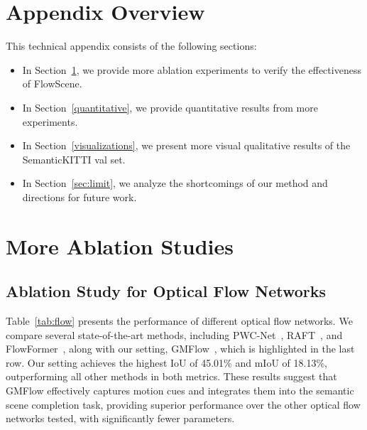 
\appendix

\section*{Appendix Overview}
This technical appendix consists of the following sections:
\begin{itemize}
\item
In Section~\ref{ablation}, we provide more ablation experiments to verify the effectiveness of FlowScene.
\item
In Section~\ref{quantitative}, we provide quantitative results from more experiments.
\item
In Section~\ref{visualizations}, we present more visual qualitative results of the SemanticKITTI val set.
\item
In Section~\ref{sec:limit},  we analyze the shortcomings of our method and directions for future work.
\end{itemize} 

\section{More Ablation Studies}
\label{ablation}
\subsection{Ablation Study for Optical Flow Networks}
Table~\ref{tab:flow} presents the performance of different optical flow networks. We compare several state-of-the-art methods, including PWC-Net~\cite{sun2018pwc}, RAFT~\cite{teed2020raft}, and FlowFormer~\cite{huang2022flowformer}, along with our setting, GMFlow~\cite{xu2022gmflow}, which is highlighted in the last row.
Our setting achieves the highest IoU of 45.01\% and mIoU of 18.13\%, outperforming all other methods in both metrics. These results suggest that GMFlow effectively captures motion cues and integrates them into the semantic scene completion task, providing superior performance over the other optical flow networks tested, with significantly fewer parameters.

